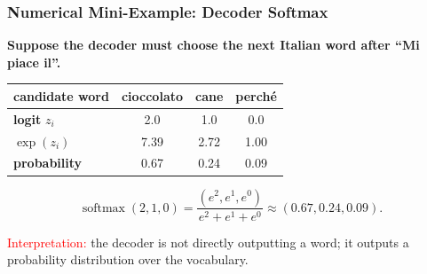 \documentclass[notes,11pt, aspectratio=169]{beamer}
\DeclareMathOperator{\softmax}{softmax}
\begin{document}
\begin{frame}
\frametitle{Numerical Mini-Example: Decoder Softmax}

\textbf{Suppose the decoder must choose the next Italian word after ``Mi piace il''.}

\vspace{4pt}
\begin{center}
\renewcommand{\arraystretch}{1.15}
\small
\begin{tabular}{l c c c}
\toprule
\textbf{candidate word} & cioccolato & cane & perché \\
\midrule
\textbf{logit} $z_i$ & 2.0 & 1.0 & 0.0 \\
\textbf{$\exp(z_i)$} & 7.39 & 2.72 & 1.00 \\
\textbf{probability} & 0.67 & 0.24 & 0.09 \\
\bottomrule
\end{tabular}
\end{center}

\vspace{6pt}
\[
    \softmax(2,1,0)
    =
    \frac{(e^2,e^1,e^0)}{e^2+e^1+e^0}
    \approx
    (0.67, 0.24, 0.09).
\]

\textcolor{red}{Interpretation:} the decoder is not directly outputting a word; it outputs a probability distribution over the vocabulary.
\end{frame}
\end{document}
